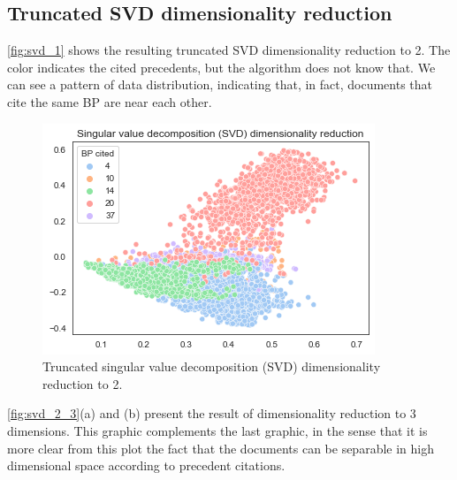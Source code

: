 \documentclass[twocolumn]{article}
\begin{document}
            \subsection{Truncated SVD dimensionality reduction}

                  \autoref{fig:svd_1} shows the resulting truncated SVD dimensionality reduction to 2. The color indicates the cited precedents, but the algorithm does not know that. We can see a pattern of data distribution, indicating that, in fact, documents that cite the same BP are near each other.

                  \begin{figure}[!h]
                        \includegraphics[width=\linewidth]{svd_1.png}
                        \caption{Truncated singular value decomposition (SVD) dimensionality reduction to 2.}
                        \label{fig:svd_1}
                  \end{figure}

                  \autoref{fig:svd_2_3}(a) and (b) present the result of dimensionality reduction to 3 dimensions. This graphic complements the last graphic, in the sense that it is more clear from this plot the fact that the documents can be separable in high dimensional space according to precedent citations.
\end{document}

